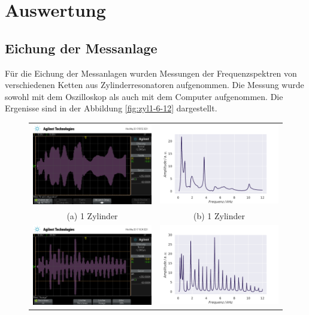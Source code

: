 \section{Auswertung}
\label{sec:auswertung}

\subsection{Eichung der Messanlage}
Für die Eichung der Messanlagen wurden Messungen der Frequenzspektren von verschiedenen Ketten aus Zylinderresonatoren aufgenommen. Die Messung wurde sowohl mit dem Oszilloskop als auch mit dem Computer aufgenommen. Die Ergenisse sind in der 
Abbildung \ref{fig:zyl1-6-12} dargestellt. 
\begin{figure}[H]
    \centering
    \begin{tabular}{cc}
      \includegraphics[width=65mm]{Daten/Zyinder/Zylinder_1.png} &   \includegraphics[width=65mm]{Daten/Zyinder/Zylinder_1.pdf} \\
    (a) 1 Zylinder & (b) 1 Zylinder \\[6pt]
     \includegraphics[width=65mm]{Daten/Zyinder/Zylinder_6.png} &   \includegraphics[width=65mm]{Daten/Zyinder/Zylinder_6.pdf} \\

\end{tabular}
\end{figure}
